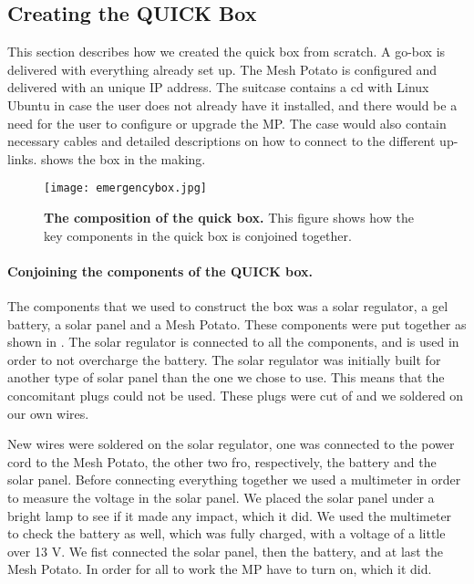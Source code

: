 \subsection{Creating the QUICK Box}
This section describes how we created the \gls{quick} box from scratch. A go-box is delivered with everything already set up. The Mesh Potato is configured and delivered with an unique IP address. The suitcase contains a cd with Linux Ubuntu in case the user does not already have it installed, and there would be a need for the user to configure or upgrade the MP. The case would also contain necessary cables and detailed descriptions on how to connect to the different up-links.  shows the box in the making.

\begin{figure}[t]
  \centering
      \texttt{[image: emergencybox.jpg]}
  \caption [The composition of the \gls{quick} box]{\textbf{\textbf{The composition of the \gls{quick} box.}} This figure shows how the key components in the \gls{quick} box is conjoined together.}
  \label{fig:emergencybox}
\end{figure}

\paragraph{Conjoining the components of the QUICK box.}
The components that we used to construct the box was a solar regulator, a gel battery, a solar panel and a Mesh Potato. These components were put together as shown in . The solar regulator is connected to all the components, and is used in order to not overcharge the battery. The solar regulator was initially built for another type of solar panel than the one we chose to use. This means that the concomitant plugs could not be used. These plugs were cut of and we soldered on our own wires.  

New wires were soldered on the solar regulator, one was connected to the power cord to the Mesh Potato, the other two fro, respectively, the battery and the solar panel. Before connecting everything together we used a multimeter in order to measure the voltage in the solar panel. We placed the solar panel under a bright lamp to see if it made any impact, which it did. We used the multimeter to check the battery as well, which was fully charged, with a voltage of a little over 13 V. 
We fist connected the solar panel, then the battery, and at last the Mesh Potato. In order for all to work the MP have to turn on, which it did.  

